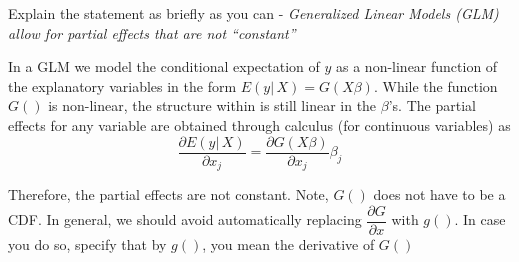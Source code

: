 
\question Explain the statement as briefly as you can - 
\textit{Generalized Linear Models (GLM) allow for partial effects that are not ``constant''}

\begin{solution}
  In a GLM we model the conditional expectation of $y$ as a non-linear function of the explanatory 
  variables in the form $E(y\vert\,X) = G(X\beta)$. While the function $G()$ is non-linear, the structure 
  within is still linear in the $\beta$'s. The partial effects for any variable are obtained through 
  calculus (for continuous variables) as 
    \[\frac{\partial E(y\vert\,X)}{\partial x_{j}} = \frac{\partial G(X\beta)}{\partial x_{j}} \beta_{j}\]

  Therefore, the partial effects are not constant. Note, $G()$ does not have to be a CDF. In general, 
  we should avoid automatically replacing $\dfrac{\partial G}{\partial x}$ with $g()$. In case you do so, 
  specify that by $g()$, you mean the derivative of $G()$
\end{solution}


